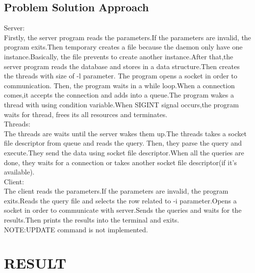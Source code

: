 \documentclass[12pt]{article}
\begin{document}
\subsection{Problem Solution Approach}
Server:\\
Firstly, the server program reads the parameters.If the parameters are invalid, the program exits.Then temporary creates a file because the daemon only have one instance.Basically, the file prevents to create another instance.After that,the server program reads the database and stores in a data structure.Then creates the threads with size of -l parameter. The program opens a socket in order to communication. Then, the program waits in a while loop.When a connection comes,it accepts the connection and adds into a queue.The program wakes a thread with using condition variable.When SIGINT signal occurs,the program waits for thread, frees its all resources and terminates.\\
Threads:\\
The threads are waits until the server wakes them up.The threads takes a socket file descriptor from queue and reads the query. Then, they parse the query and execute.They send the data using socket file descriptor.When all the queries are done, they waits for a connection or takes another socket file descriptor(if it's available).\\
Client:\\
The client reads the parameters.If the parameters are invalid, the program exits.Reads the query file and selects the row related to -i parameter.Opens a socket in order to communicate with server.Sends the queries and waits for the results.Then prints the results into the terminal and exits.\\
NOTE:UPDATE command is not implemented.
\section{RESULT}
\end{document}
